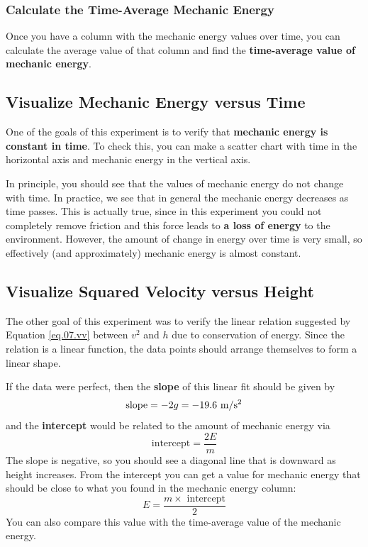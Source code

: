 \subsubsection{Calculate the Time-Average Mechanic Energy}
%
Once you have a column with the mechanic energy values over time, you can calculate the average value of that column and find the \textbf{time-average value of mechanic energy}.
%
\subsection{Visualize Mechanic Energy versus Time}
%
One of the goals of this experiment is to verify that \textbf{mechanic energy is constant in time}. To check this, you can make a scatter chart with time in the horizontal axis and mechanic energy in the vertical axis.

In principle, you should see that the values of mechanic energy do not change with time. In practice, we see that in general the mechanic energy decreases as time passes. This is actually true, since in this experiment you could not completely remove friction and this force leads to \textbf{a loss of energy} to the environment. However, the amount of change in energy over time is very small, so effectively (and approximately) mechanic energy is almost constant.
%
\subsection{Visualize Squared Velocity versus Height}
%
The other goal of this experiment was to verify the linear relation suggested by Equation \ref{eq.07.vv} between $v^{2}$ and $h$ due to conservation of energy. Since the relation is a linear function, the data points should arrange themselves to form a linear shape.

If the data were perfect, then the \textbf{slope} of this linear fit should be given by
\begin{equation} \label{eq.07.slope}
    \text{slope} = -2g = -19.6 \ \text{m/s\textsuperscript{2}}
\end{equation}
and the \textbf{intercept} would be related to the amount of mechanic energy via
\begin{equation}
    \text{intercept} = \frac{2 E}{m}
\end{equation}
The slope is negative, so you should see a diagonal line that is downward as height increases. From the intercept you can get a value for mechanic energy that should be close to what you found in the mechanic energy column:
\begin{equation} \label{eq.07.intercept}
    E = \frac{m \times \text{ intercept}}{2}
\end{equation}
You can also compare this value with the time-average value of the mechanic energy.
%
